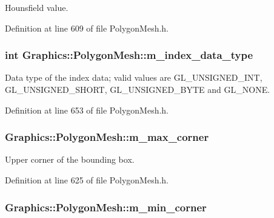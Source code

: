 Hounsfield value. 



Definition at line 609 of file PolygonMesh.h.

\hypertarget{class_graphics_1_1_polygon_mesh_acf9a781bb8d8b4a3905f41bea954e83d}{
\subsubsection[{m\_\-index\_\-data\_\-type}]{\setlength{\rightskip}{0pt plus 5cm}int {\bf Graphics::PolygonMesh::m\_\-index\_\-data\_\-type}}}
\label{class_graphics_1_1_polygon_mesh_acf9a781bb8d8b4a3905f41bea954e83d}


Data type of the index data; valid values are GL\_\-UNSIGNED\_\-INT, GL\_\-UNSIGNED\_\-SHORT, GL\_\-UNSIGNED\_\-BYTE and GL\_\-NONE. 



Definition at line 653 of file PolygonMesh.h.

\hypertarget{class_graphics_1_1_polygon_mesh_a0a315335b8e97b4a533308365817660d}{
\subsubsection[{m\_\-max\_\-corner}]{ {\bf Graphics::PolygonMesh::m\_\-max\_\-corner}}}
\label{class_graphics_1_1_polygon_mesh_a0a315335b8e97b4a533308365817660d}


Upper corner of the bounding box. 



Definition at line 625 of file PolygonMesh.h.

\hypertarget{class_graphics_1_1_polygon_mesh_a15afbd27c9bc4138d6b820a410401d16}{
\subsubsection[{m\_\-min\_\-corner}]{ {\bf Graphics::PolygonMesh::m\_\-min\_\-corner}}}
\label{class_graphics_1_1_polygon_mesh_a15afbd27c9bc4138d6b820a410401d16}



